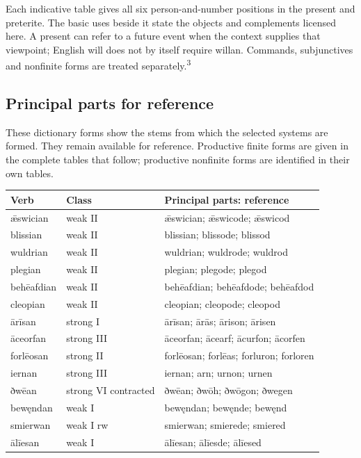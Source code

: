Each indicative table gives all six person-and-number positions in the present and preterite. The basic uses beside it state the objects and complements licensed here. A present can refer to a future event when the context supplies that viewpoint; English will does not by itself require willan. Commands, subjunctives and nonfinite forms are treated separately.\textsuperscript{3}

\subsection*{Principal parts for reference}

These dictionary forms show the stems from which the selected systems are formed. They remain available for reference. Productive finite forms are given in the complete tables that follow; productive nonfinite forms are identified in their own tables.

\par\begingroup
\fontsize{10.5}{13.2}\selectfont
\setlength{\LTleft}{0pt}\setlength{\LTright}{\fill}
\noindent
\begin{tabular}{@{}>{\raggedright\arraybackslash}p{24.84mm}>{\raggedright\arraybackslash}p{36.02mm}>{\raggedright\arraybackslash}p{57.51mm}@{}}
\toprule
\textbf{Verb} & \textbf{Class} & \textbf{Principal parts: reference} \\
\midrule
ǣswician & weak II & ǣswician; ǣswicode; ǣswicod \\
blissian & weak II & blissian; blissode; blissod \\
wuldrian & weak II & wuldrian; wuldrode; wuldrod \\
plegian & weak II & plegian; plegode; plegod \\
behēafdian & weak II & behēafdian; behēafdode; behēafdod \\
cleopian & weak II & cleopian; cleopode; cleopod \\
ārīsan & strong I & ārīsan; ārās; ārison; ārisen \\
āceorfan & strong III & āceorfan; ācearf; ācurfon; ācorfen \\
forlēosan & strong II & forlēosan; forlēas; forluron; forloren \\
iernan & strong III & iernan; arn; urnon; urnen \\
ðwēan & strong VI contracted & ðwēan; ðwōh; ðwōgon; ðwegen \\
bewęndan & weak I & bewęndan; bewęnde; bewęnd \\
smierwan & weak I rw & smierwan; smierede; smiered \\
ālīesan & weak I & ālīesan; ālīesde; ālīesed \\
\bottomrule
\end{tabular}
\par\endgroup

